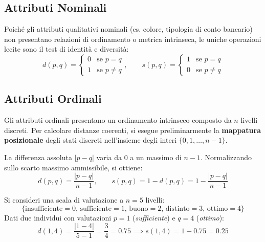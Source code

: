 \FloatBarrier
\subsection{Attributi Nominali}
Poiché gli attributi qualitativi nominali (es. colore, tipologia di conto bancario) non presentano relazioni di ordinamento o metrica intrinseca, le uniche operazioni lecite sono il test di identità e diversità:
\begin{equation}
    d(p, q) = \begin{cases} 0 & \text{se } p = q \\ 1 & \text{se } p \neq q \end{cases}, \qquad
    s(p, q) = \begin{cases} 1 & \text{se } p = q \\ 0 & \text{se } p \neq q \end{cases}
\end{equation}

\FloatBarrier
\subsection{Attributi Ordinali}
Gli attributi ordinali presentano un ordinamento intrinseco composto da $n$ livelli discreti. Per calcolare distanze coerenti, si esegue preliminarmente la \textbf{mappatura posizionale} degli stati discreti nell'insieme degli interi $\{0, 1, \dots, n-1\}$.

La differenza assoluta $|p - q|$ varia da $0$ a un massimo di $n-1$. Normalizzando sullo scarto massimo ammissibile, si ottiene:
\begin{equation}
    d(p, q) = \frac{|p - q|}{n - 1}, \qquad s(p, q) = 1 - d(p, q) = 1 - \frac{|p - q|}{n - 1}
\end{equation}

\begin{example}
Si consideri una scala di valutazione a $n = 5$ livelli:
\begin{equation}
    \{\text{insufficiente} = 0,\, \text{sufficiente} = 1,\, \text{buono} = 2,\, \text{distinto} = 3,\, \text{ottimo} = 4\}
\end{equation}
Dati due individui con valutazioni $p = 1$ (\textit{sufficiente}) e $q = 4$ (\textit{ottimo}):
\begin{equation}
    d(1, 4) = \frac{|1 - 4|}{5 - 1} = \frac{3}{4} = 0.75 \implies s(1, 4) = 1 - 0.75 = 0.25
\end{equation}
\end{example}

